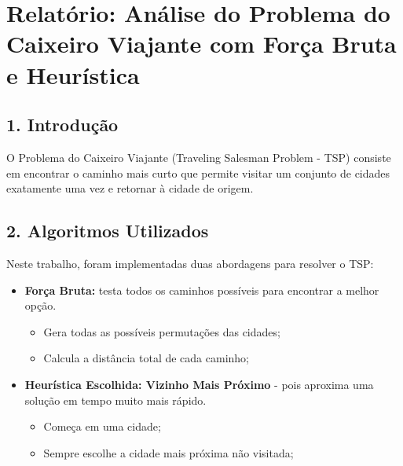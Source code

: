 \documentclass[
]{article}
\author{}
\date{\vspace{-2.5em}}
\providecommand{\tightlist}{%
  \setlength{\itemsep}{0pt}\setlength{\parskip}{0pt}}
\begin{document}
\hypertarget{relatuxf3rio-anuxe1lise-do-problema-do-caixeiro-viajante-com-foruxe7a-bruta-e-heuruxedstica}{%
\section{Relatório: Análise do Problema do Caixeiro Viajante com Força
Bruta e
Heurística}\label{relatuxf3rio-anuxe1lise-do-problema-do-caixeiro-viajante-com-foruxe7a-bruta-e-heuruxedstica}}

\hypertarget{introduuxe7uxe3o}{%
\subsection{1. Introdução}\label{introduuxe7uxe3o}}

O Problema do Caixeiro Viajante (Traveling Salesman Problem - TSP)
consiste em encontrar o caminho mais curto que permite visitar um
conjunto de cidades exatamente uma vez e retornar à cidade de origem.

\hypertarget{algoritmos-utilizados}{%
\subsection{2. Algoritmos Utilizados}\label{algoritmos-utilizados}}

Neste trabalho, foram implementadas duas abordagens para resolver o TSP:

\begin{itemize}
\tightlist
\item
  \textbf{Força Bruta:} testa todos os caminhos possíveis para encontrar
  a melhor opção.

  \begin{itemize}
  \tightlist
  \item
    Gera todas as possíveis permutações das cidades;
  \item
    Calcula a distância total de cada caminho;
  \end{itemize}
\item
  \textbf{Heurística Escolhida: Vizinho Mais Próximo} - pois aproxima
  uma solução em tempo muito mais rápido.

  \begin{itemize}
  \tightlist
  \item
    Começa em uma cidade;
  \item
    Sempre escolhe a cidade mais próxima não visitada;
  \end{itemize}
\end{itemize}
\end{document}
